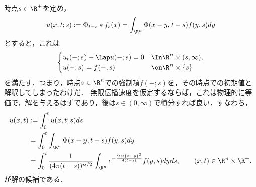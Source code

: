 \documentclass[uplatex,dvipdfmx]{jsreport}
\begin{document}
\begin{observation}[Duhamelの発想]
    時点$s\in\R^+$を定め，
    \[u(x,t;s):=\Phi_{t-s}*f_s(x)=\int_{\R^n}\Phi(x-y,t-s)f(y,s)dy\]
    とすると，これは
    \[\begin{cases}
        u_t(-;s)-\Lap u(-;s)=0&\In\R^n\times(s,\infty),\\
        u(-;s)=f(-,s)&\on\R^n\times\{s\}
    \end{cases}\]
    を満たす．つまり，時点$s\in\R^n$での強制項$f(-;s)$を，その時点での初期値と解釈してしまったわけだ．
    無限伝播速度を仮定するならば，これは物理的に等価で，解を与えるはずであり，後は$s\in(0,\infty)$で積分すれば良い．すなわち，
    \begin{align*}
        u(x,t)&:=\int^t_0u(x,t;s)ds\\
        &=\int^t_0\int_{\R^n}\Phi(x-y,t-s)f(y,s)dy\\
        &=\int^t_0\frac{1}{(4\pi (t-s))^{n/2}}\int_{\R^n}e^{-\frac{\abs{x-y}^2}{4(t-s)}}f(y,s)dyds,\qquad(x,t)\in\R^n\times\R^+.
    \end{align*}
    が解の候補である．
\end{observation}
\end{document}
